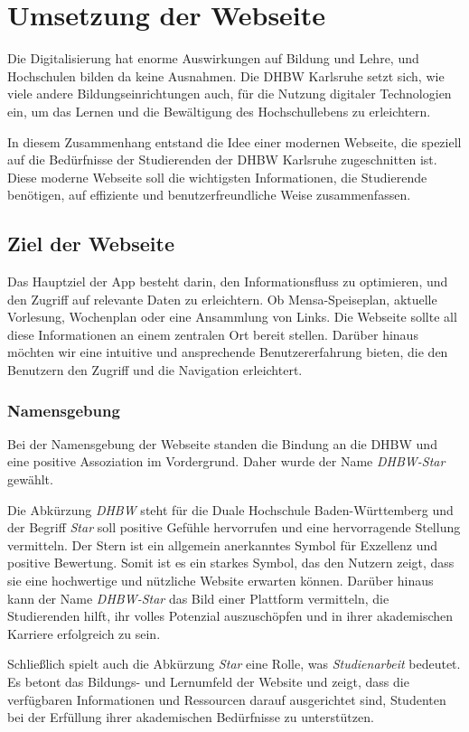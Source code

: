 \chapter{Umsetzung der Webseite}
Die Digitalisierung hat enorme Auswirkungen auf Bildung und Lehre, und Hochschulen bilden da keine Ausnahmen. Die DHBW Karlsruhe setzt sich, wie viele andere Bildungseinrichtungen auch, für die Nutzung digitaler Technologien ein, um das Lernen und die Bewältigung des Hochschullebens zu erleichtern.

In diesem Zusammenhang entstand die Idee einer modernen Webseite, die speziell auf die Bedürfnisse der Studierenden der DHBW Karlsruhe zugeschnitten ist. Diese moderne Webseite soll die wichtigsten Informationen, die Studierende benötigen, auf effiziente und benutzerfreundliche Weise zusammenfassen.

\section{Ziel der Webseite}
Das Hauptziel der App besteht darin, den Informationsfluss zu optimieren, und den Zugriff auf relevante Daten zu erleichtern. Ob Mensa-Speiseplan, aktuelle Vorlesung, Wochenplan oder eine Ansammlung von Links. Die Webseite sollte all diese Informationen an einem zentralen Ort bereit stellen. Darüber hinaus möchten wir eine intuitive und ansprechende Benutzererfahrung bieten, die den Benutzern den Zugriff und die Navigation erleichtert.
\newpage

\subsection{Namensgebung}
Bei der Namensgebung der Webseite standen die Bindung an die DHBW und eine positive Assoziation im Vordergrund. Daher wurde der Name \emph{DHBW-Star} gewählt.

Die Abkürzung \emph{DHBW} steht  für die Duale Hochschule Baden-Württemberg und der Begriff \emph{Star} soll positive Gefühle hervorrufen und eine hervorragende Stellung vermitteln. Der Stern ist ein allgemein anerkanntes Symbol für Exzellenz und positive Bewertung. Somit ist es ein starkes Symbol, das den Nutzern zeigt, dass sie eine hochwertige und nützliche Website erwarten können. Darüber hinaus kann der Name \emph{DHBW-Star} das Bild einer Plattform vermitteln, die  Studierenden  hilft, ihr volles Potenzial auszuschöpfen und in ihrer akademischen Karriere erfolgreich zu sein.

Schließlich spielt auch die Abkürzung \emph{Star} eine Rolle, was \emph{Studienarbeit} bedeutet. Es betont das Bildungs- und Lernumfeld der Website und zeigt, dass die verfügbaren Informationen und Ressourcen darauf ausgerichtet sind, Studenten bei der Erfüllung ihrer akademischen Bedürfnisse zu unterstützen.

